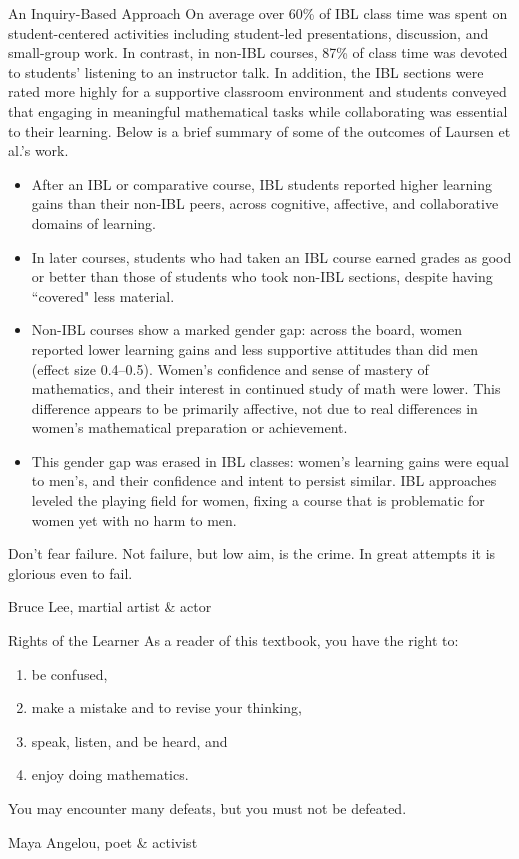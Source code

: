 \begin{section}{An Inquiry-Based Approach}
On average over 60\% of IBL class time was spent on student-centered activities including student-led presentations, discussion, and small-group work. In contrast, in non-IBL courses, 87\% of class time was devoted to students' listening to an instructor talk. In addition, the IBL sections were rated more highly for a supportive classroom environment and students conveyed that engaging in meaningful mathematical tasks while collaborating was essential to their learning. Below is a brief summary of some of the outcomes of Laursen et al.'s work.
\begin{itemize}
\item After an IBL or comparative course, IBL students reported higher learning gains than their non-IBL peers, across cognitive, affective, and collaborative domains of learning.
\item In later courses, students who had taken an IBL course earned grades as good or better than those of students who took non-IBL sections, despite having ``covered" less material.
\item Non-IBL courses show a marked gender gap: across the board, women reported lower learning gains and less supportive attitudes than did men (effect size 0.4--0.5). Women's confidence and sense of mastery of mathematics, and their interest in continued study of math were lower. This difference appears to be primarily affective, not due to real differences in women's mathematical preparation or achievement.
\item This gender gap was erased in IBL classes: women's learning gains were equal to men's, and their confidence and intent to persist similar. IBL approaches leveled the playing field for women, fixing a course that is problematic for women yet with no harm to men.
\end{itemize}

\epigraph{Don't fear failure.  Not failure, but low aim, is the crime. In great attempts it is glorious even to fail.}{Bruce Lee, martial artist \& actor}

\end{section}

\begin{section}{Rights of the Learner}\label{sec:Rights of the Learner}
As a reader of this textbook, you have the right to:
\begin{enumerate}
\item be confused,
\item make a mistake and to revise your thinking,
\item speak, listen, and be heard, and
\item enjoy doing mathematics.
\end{enumerate}

\epigraph{You may encounter many defeats, but you must not be defeated.}{Maya Angelou, poet \& activist}

\end{section}

